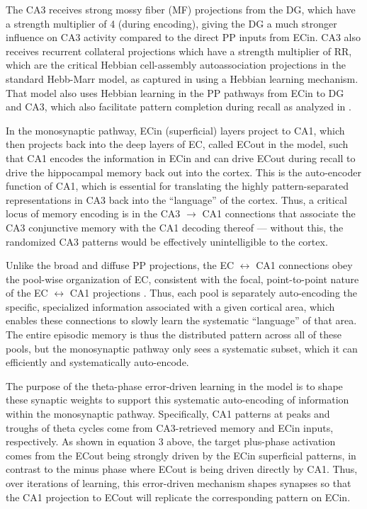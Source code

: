 \documentclass[11pt,twoside]{article}
\newif\myifpdf
\begin{document}
The CA3 receives strong mossy fiber (MF) projections from the DG, which have a strength multiplier of 4 (during encoding), giving the DG a much stronger influence on CA3 activity compared to the direct PP inputs from ECin.  CA3 also receives recurrent collateral projections which have a strength multiplier of RR, which are the critical Hebbian cell-assembly autoassociation projections in the standard Hebb-Marr model, as captured in \cite{KetzMorkondaOReilly13} using a Hebbian learning mechanism.  That model also uses Hebbian learning in the PP pathways from ECin to DG and CA3, which also facilitate pattern completion during recall as analyzed in \citet{OReillyMcClelland94}.

In the monosynaptic pathway, ECin (superficial) layers project to CA1, which then projects back into the deep layers of EC, called ECout in the model, such that CA1 encodes the information in ECin and can drive ECout during recall to drive the hippocampal memory back out into the cortex.  This is the auto-encoder function of CA1, which is essential for translating the highly pattern-separated representations in CA3 back into the ``language'' of the cortex.  Thus, a critical locus of memory encoding is in the CA3 $\rightarrow$ CA1 connections that associate the CA3 conjunctive memory with the CA1 decoding thereof --- without this, the randomized CA3 patterns would be effectively unintelligible to the cortex.

Unlike the broad and diffuse PP projections, the EC $\leftrightarrow$ CA1 connections obey the pool-wise organization of EC, consistent with the focal, point-to-point nature of the EC $\leftrightarrow$ CA1 projections \citep{WitterDoanJacobsenEtAl17}.  Thus, each pool is separately auto-encoding the specific, specialized information associated with a given cortical area, which enables these connections to slowly learn the systematic ``language'' of that area.  The entire episodic memory is thus the distributed pattern across all of these pools, but the monosynaptic pathway only sees a systematic subset, which it can efficiently and systematically auto-encode.

The purpose of the theta-phase error-driven learning in the \citet{KetzMorkondaOReilly13} model is to shape these synaptic weights to support this systematic auto-encoding of information within the monosynaptic pathway.  Specifically, CA1 patterns at peaks and troughs of theta cycles come from CA3-retrieved memory and ECin inputs, respectively.  As shown in equation 3 above, the target plus-phase activation comes from the ECout being strongly driven by the ECin superficial patterns, in contrast to the minus phase where ECout is being driven directly by CA1.  Thus, over iterations of learning, this error-driven mechanism shapes synapses so that the CA1 projection to ECout will replicate the corresponding pattern on ECin.
\end{document}
